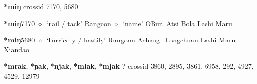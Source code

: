\item
\textbf{*miŋ}
  {\tiny crossid 7170, 5680}
  \begin{list}{}{\leftmargin=1.5em \itemindent=-1.5em}
  \item {\footnotesize \textbf{*miŋ}}{\tiny 7170}
         $\diamond$~`nail / tack'
         Rangoon 
\hspace{1ex}
         $\diamond$~`name'
         OBur. 
\hspace{1ex}
         Atsi 
\hspace{1ex}
         Bola 
\hspace{1ex}
         Lashi 
\hspace{1ex}
         Maru 
  \item {\footnotesize \textbf{*miŋ}}{\tiny 5680}
\hspace{1ex}
         $\diamond$~`hurriedly / hastily'
         Rangoon 
\hspace{1ex}
         Achang\_Longchuan 
\hspace{1ex}
         Lashi 
\hspace{1ex}
         Maru 
\hspace{1ex}
         Xiandao 
  \end{list}
\item
\textbf{*mrak}, \textbf{*ɲak}, \textbf{*njak}, \textbf{*mlak}, \textbf{*mjak}
?
  {\tiny crossid 3860, 2895, 3861, 6958, 292, 4927, 4529, 12979}
